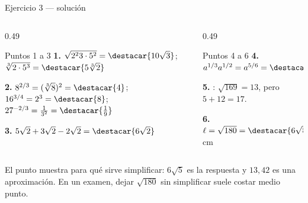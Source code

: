 \documentclass[aspectratio=169,10pt]{beamer}
\begin{document}
\begin{frame}{Ejercicio 3 — solución}
  \scriptsize
  \begin{columns}[T,onlytextwidth]
    \begin{column}{0.49\textwidth}
      \begin{block}{Puntos 1 a 3}
        \tiny
        \textbf{1.} $\sqrt{2^{2}3\cdot 5^{2}} = \destacar{10\sqrt{3}}$; \
        $\sqrt[3]{2\cdot 5^{3}} = \destacar{5\sqrt[3]{2}}$

        \vspace{0.08cm}
        \textbf{2.} $8^{2/3}=(\sqrt[3]{8})^{2}=\destacar{4}$; \
        $16^{3/4}=2^{3}=\destacar{8}$; \
        $27^{-2/3}=\tfrac{1}{3^{2}}=\destacar{\tfrac{1}{9}}$

        \vspace{0.08cm}
        \textbf{3.} $5\sqrt2+3\sqrt2-2\sqrt2 = \destacar{6\sqrt{2}}$
      \end{block}
    \end{column}
    \begin{column}{0.49\textwidth}
      \begin{block}{Puntos 4 a 6}
        \tiny
        \textbf{4.} $a^{1/3}a^{1/2}=a^{5/6}=\destacar{\sqrt[6]{a^{5}}}$

        \vspace{0.08cm}
        \textbf{5.} \destacar{No}: $\sqrt{169}=13$, pero $5+12=17$.

        \vspace{0.08cm}
        \textbf{6.} $\ell=\sqrt{180}=\destacar{6\sqrt{5}}
        \approx 13{,}42$ cm
      \end{block}
    \end{column}
  \end{columns}

  \vspace{0.08cm}
  {\tiny\color{uniGris} El punto  muestra para qué sirve
  simplificar: $6\sqrt{5}$ es la respuesta  y $13{,}42$ es una
  aproximación. En un examen, dejar $\sqrt{180}$ sin simplificar suele costar
  medio punto.}
\end{frame}
\end{document}

